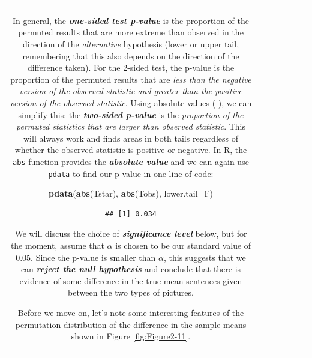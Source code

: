 \documentclass[]{book}
\newenvironment{Shaded}{\begin{snugshade}}{\end{snugshade}}
\newcommand{\KeywordTok}[1]{\textcolor[rgb]{0.13,0.29,0.53}{\textbf{#1}}}
\newcommand{\DataTypeTok}[1]{\textcolor[rgb]{0.13,0.29,0.53}{#1}}
\newcommand{\NormalTok}[1]{#1}
\theoremstyle{definition}
\theoremstyle{definition}
\theoremstyle{remark}
\begin{document}
\begin{longtable}[]{@{}ccccccc@{}}
\begin{minipage}[b]{0.10\columnwidth}
In general, the \textbf{\emph{one-sided test p-value}} is the proportion
of the permuted results that are more extreme than observed in the
direction of the \emph{alternative} hypothesis (lower or upper tail,
remembering that this also depends on the direction of the difference
taken). For the 2-sided test, the p-value is the proportion of the
permuted results that are \emph{less than the negative version of the
observed statistic and greater than the positive version of the observed
statistic}. Using absolute values (\textbar{} \textbar{}), we can
simplify this: the \textbf{\emph{two-sided p-value}} is the
\emph{proportion of the \textbar{}permuted statistics\textbar{} that are
larger than \textbar{}observed statistic\textbar{}}. This will always
work and finds areas in both tails regardless of whether the observed
statistic is positive or negative. In R, the \texttt{abs} function
provides the \textbf{\emph{absolute value}} and we can again use
\texttt{pdata} to find our p-value in one line of code:

\begin{Shaded}
\begin{Highlighting}[]
\KeywordTok{pdata}\NormalTok{(}\KeywordTok{abs}\NormalTok{(Tstar), }\KeywordTok{abs}\NormalTok{(Tobs), }\DataTypeTok{lower.tail=}\NormalTok{F)}
\end{Highlighting}
\end{Shaded}

\begin{verbatim}
## [1] 0.034
\end{verbatim}

We will discuss the choice of \textbf{\emph{significance level}} below,
but for the moment, assume that \(\alpha\) is chosen to be our standard
value of 0.05. Since the p-value is smaller than \(\alpha\), this
suggests that we can \textbf{\emph{reject the null hypothesis}} and
conclude that there is evidence of some difference in the true mean
sentences given between the two types of pictures.

Before we move on, let's note some interesting features of the
permutation distribution of the difference in the sample means shown in
Figure \ref{fig:Figure2-11}.


\end{minipage}
\end{longtable}
\end{document}
